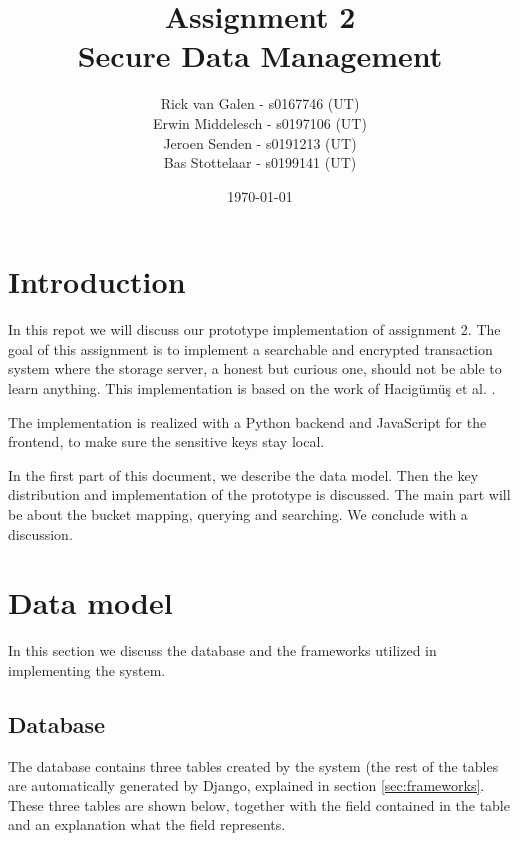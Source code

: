 \documentclass[a4paper]{article}
\begin{document}
\title{Assignment 2 \\ Secure Data Management}
\author{Rick van Galen - s0167746 (UT) \\ Erwin Middelesch - s0197106 (UT) \\ Jeroen Senden - s0191213 (UT) \\ Bas Stottelaar - s0199141 (UT)}
\date{\today}
\maketitle

\section{Introduction}
	In this repot we will discuss our prototype implementation of assignment 2. The goal of this assignment is to implement a searchable and encrypted transaction system where the storage server, a honest but curious one, should not be able to learn anything. This implementation is based on the work of Hacig{\"u}m{\"u}{\c{s}} et al. \cite{hacigumucs2002executing}.
	
	The implementation is realized with a Python backend and JavaScript for the frontend, to make sure the sensitive keys stay local.
	
	In the first part of this document, we describe the data model. Then the key distribution and implementation of the prototype is discussed. The main part will be about the bucket mapping, querying and searching. We conclude with a discussion.

\section{Data model}
	In this section we discuss the database and the frameworks utilized in implementing the system.
    
    \subsection{Database}
    	The database contains three tables created by the system (the rest of the tables are automatically generated by Django, explained in section \ref{sec:frameworks}. These three tables are shown below, together with the field contained in the table and an explanation what the field represents.
        
\end{document}

